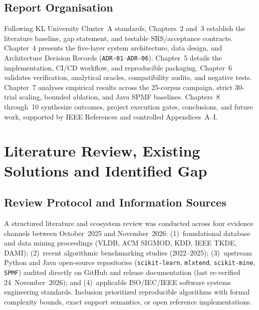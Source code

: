 \section{Report Organisation}
Following KL University Cluster~A standards, Chapters~2 and~3 establish the literature baseline, gap statement, and testable SRS/acceptance contracts. Chapter~4 presents the five-layer system architecture, data design, and Architecture Decision Records (\texttt{ADR-01}--\texttt{ADR-06}). Chapter~5 details the implementation, CI/CD workflow, and reproducible packaging. Chapter~6 validates verification, analytical oracles, compatibility audits, and negative tests. Chapter~7 analyses empirical results across the 25-corpus campaign, strict 30-trial scaling, bounded ablation, and Java SPMF baselines. Chapters~8 through~10 synthesize outcomes, project execution gates, conclusions, and future work, supported by IEEE References and controlled Appendices~A--I.

\chapter{Literature Review, Existing Solutions and Identified Gap}

\section{Review Protocol and Information Sources}
A structured literature and ecosystem review was conducted across four evidence channels between October~2025 and November~2026: (1)~foundational database and data mining proceedings (VLDB, ACM SIGMOD, KDD, IEEE TKDE, DAMI); (2)~recent algorithmic benchmarking studies (2022--2025); (3)~upstream Python and Java open-source repositories (\texttt{scikit-learn}, \texttt{mlxtend}, \texttt{scikit-mine}, \texttt{SPMF}) audited directly on GitHub and release documentation (last re-verified 24~November~2026); and (4)~applicable ISO/IEC/IEEE software systems engineering standards. Inclusion prioritized reproducible algorithms with formal complexity bounds, exact support semantics, or open reference implementations.

